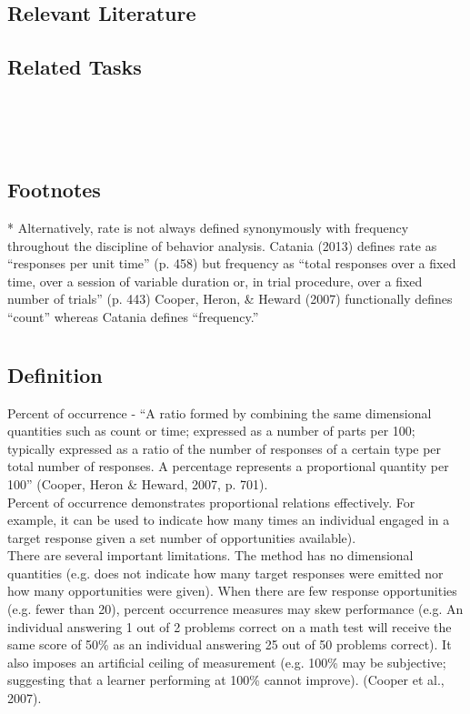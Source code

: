 \subsection{Relevant Literature}
\begin{refsection}
\nocite{catania2013learning,cooper2007applied}
\printbibliography[heading=none]
\end{refsection}

\subsection{Related Tasks}
\fouriOne{}\\
\fourhOne{}\\
\fourFKFourtySeven{}\\

\subsection{Footnotes}
* Alternatively, rate is not always defined synonymously with frequency throughout the discipline of behavior analysis. Catania (2013) defines rate as ``responses per unit time'' (p. 458) but frequency as ``total responses over a fixed time, over a session of variable duration or, in trial procedure, over a fixed number of trials'' (p. 443) Cooper, Heron, \& Heward (2007) functionally defines ``count'' whereas Catania defines ``frequency.''
%
\clearpage \section{\fouraSix{}}
\subsection{Definition}
Percent of occurrence - ``A ratio formed by combining the same dimensional quantities such as count or time; expressed as a number of parts per 100; typically expressed as a ratio of the number of responses of a certain type per total number of responses. A percentage represents a proportional quantity per 100'' (Cooper, Heron \& Heward, 2007, p. 701).\\

Percent of occurrence demonstrates proportional relations effectively. For example, it can be used to indicate how many times an individual engaged in a target response given a set number of opportunities available).\\

There are several important limitations. The method has no dimensional quantities (e.g. does not indicate how many target responses were emitted nor how many opportunities were given). When there are few response opportunities (e.g. fewer than 20), percent occurrence measures may skew performance (e.g. An individual  answering 1 out of 2 problems correct on a math test will receive the same score of 50\% as an individual answering 25 out of 50 problems correct). It also imposes an artificial ceiling of measurement (e.g. 100\% may be subjective; suggesting that a learner performing at 100\% cannot improve). (Cooper et al., 2007).

